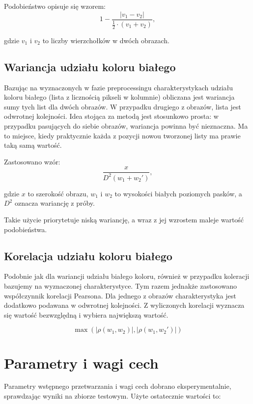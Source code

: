 \documentclass{mwart}
\begin{document}
Podobieństwo opisuje się wzorem:
\begin{equation*}
    1 - \frac{|v_1 - v_2|}{\frac{1}{2} \cdot (v_1 + v_2)},
\end{equation*}

gdzie $v_1$ i $v_2$ to liczby wierzchołków w dwóch obrazach.

\subsection{Wariancja udziału koloru białego}
\label{subsection:wariancja-koloru-bialego}
Bazując na wyznaczonych w fazie preprocessingu charakterystykach udziału koloru białego (lista z licznością pikseli w kolumnie) obliczana jest wariancja sumy tych list dla dwóch obrazów. W przypadku drugiego z obrazów, lista jest odwrotnej kolejności. Idea stojąca za metodą jest stosunkowo prosta: w przypadku pasujących do siebie obrazów, wariancja powinna być nieznaczna. Ma to miejsce, kiedy praktycznie każda z pozycji nowou tworzonej listy ma prawie taką samą wartość.

Zastosowano wzór:
\begin{equation*}
    \frac{x}{D^2(w_1 + w_2')},
\end{equation*}

gdzie $x$ to szerokość obrazu, $w_1$ i $w_2$ to wysokości białych poziomych pasków, a $D^2$ oznacza wariancję z próby. 

Takie użycie priorytetuje niską wariancję, a wraz z jej wzrostem maleje wartość podobieństwa.

\subsection{Korelacja udziału koloru białego}
Podobnie jak dla wariancji udziału białego koloru, również w przypadku koleracji bazujemy na wyznaczonej charakterystyce. Tym razem jednakże zastosowano współczynnik korelacji Pearsona.
Dla jednego z obrazów charakterystyka jest dodatkowo podawana w odwrotnej kolejności. Z wyliczonych korelacji wyznacza się wartość bezwzględną i wybiera największą wartość.

\begin{equation*}
\max(|\rho(w_1, w_2)|, |\rho(w_1, w_2')|)
\end{equation*}

\section{Parametry i wagi cech}
Parametry wstępnego przetwarzania i wagi cech dobrano eksperymentalnie, sprawdzając wyniki na zbiorze testowym.
Użyte ostatecznie wartości to:
\end{document}
